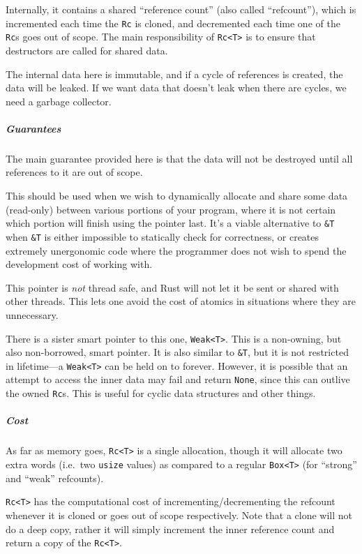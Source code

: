 \documentclass[a4paper,]{book}
\let\oldsubparagraph\subparagraph
\renewcommand{\subparagraph}[1]{\oldsubparagraph{#1}\mbox{}}
\begin{document}
Internally, it contains a shared ``reference count'' (also called
``refcount''), which is incremented each time the \texttt{Rc} is cloned,
and decremented each time one of the \texttt{Rc}s goes out of scope. The
main responsibility of \texttt{Rc\textless{}T\textgreater{}} is to
ensure that destructors are called for shared data.

The internal data here is immutable, and if a cycle of references is
created, the data will be leaked. If we want data that doesn't leak when
there are cycles, we need a garbage collector.

\subparagraph{Guarantees}\label{guarantees}

The main guarantee provided here is that the data will not be destroyed
until all references to it are out of scope.

This should be used when we wish to dynamically allocate and share some
data (read-only) between various portions of your program, where it is
not certain which portion will finish using the pointer last. It's a
viable alternative to \texttt{\&T} when \texttt{\&T} is either
impossible to statically check for correctness, or creates extremely
unergonomic code where the programmer does not wish to spend the
development cost of working with.

This pointer is \emph{not} thread safe, and Rust will not let it be sent
or shared with other threads. This lets one avoid the cost of atomics in
situations where they are unnecessary.

There is a sister smart pointer to this one,
\texttt{Weak\textless{}T\textgreater{}}. This is a non-owning, but also
non-borrowed, smart pointer. It is also similar to \texttt{\&T}, but it
is not restricted in lifetime---a
\texttt{Weak\textless{}T\textgreater{}} can be held on to forever.
However, it is possible that an attempt to access the inner data may
fail and return \texttt{None}, since this can outlive the owned
\texttt{Rc}s. This is useful for cyclic data structures and other
things.

\subparagraph{Cost}\label{cost}

As far as memory goes, \texttt{Rc\textless{}T\textgreater{}} is a single
allocation, though it will allocate two extra words (i.e.~two
\texttt{usize} values) as compared to a regular
\texttt{Box\textless{}T\textgreater{}} (for ``strong'' and ``weak''
refcounts).

\texttt{Rc\textless{}T\textgreater{}} has the computational cost of
incrementing/decrementing the refcount whenever it is cloned or goes out
of scope respectively. Note that a clone will not do a deep copy, rather
it will simply increment the inner reference count and return a copy of
the \texttt{Rc\textless{}T\textgreater{}}.
\end{document}
